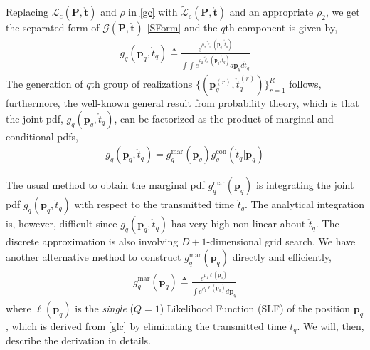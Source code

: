 \documentclass[review]{elsarticle}
\begin{document}
Replacing $\mathcal{L}_c(\boldsymbol{P},\mathring{\boldsymbol{t}})$ and $\rho$ in \eqref{gc} with $\tilde{\mathcal{L}}_c(\boldsymbol{P},\mathring{\boldsymbol{t}})$ and an appropriate $\rho_2$, we get the separated form of $\mathcal{G}(\boldsymbol{P},\mathring{\boldsymbol{t}})$ \eqref{SForm} and the $q$th component is given by,
\begin{align}\label{gq}
    g_q(\boldsymbol{p}_q,\mathring{t}_q)\triangleq\frac{e^{\rho_2 \tilde{\ell}_c(\boldsymbol{p}_q,\mathring{t}_q)}}{\int\int e^{\rho_2 \tilde{\ell}_c(\boldsymbol{p}_q,\mathring{t}_q)}d\boldsymbol{p}_qd\mathring{t}_q }
\end{align}
The generation of $q$th group of realizations $\lbrace(\boldsymbol{p}_q^{(r)},\mathring{t}_q^{(r)})\rbrace_{r=1}^{R}$ follows, furthermore, the well-known general result from probability theory, which is that the joint pdf, $g_q(\boldsymbol{p}_q,\mathring{t}_q)$, can be factorized as the product of marginal and conditional pdfs,
\begin{align}
    g_q(\boldsymbol{p}_q,\mathring{t}_q)=g_{q}^{\text{mar}}(\boldsymbol{p}_q)g_{q}^{\text{con}}(\mathring{t}_q\vert \boldsymbol{p}_q)
\end{align}

The usual method to obtain the marginal pdf $g_{q}^{\text{mar}}(\boldsymbol{p}_q)$ is integrating the joint pdf $g_q(\boldsymbol{p}_q,\mathring{t}_q)$ with respect to the transmitted time $\mathring{t}_q$. The analytical  integration is, however, difficult since $g_q(\boldsymbol{p}_q,\mathring{t}_q)$ has very high non-linear about $\mathring{t}_q$. The discrete approximation is also involving $D+1$-dimensional grid search. We have another alternative method to construct $ g_{q}^{\text{mar}}(\boldsymbol{p}_q)$ directly and efficiently,
\begin{align}\label{gmar}
    g_{q}^{\text{mar}}(\boldsymbol{p}_q)\triangleq\frac{e^{\rho_1\ell(\boldsymbol{p}_q)}}{\int e^{\rho_1\ell(\boldsymbol{p}_q)} d\boldsymbol{p}_q}
\end{align} 
where $\ell(\boldsymbol{p}_q)$ is the \emph{single} ($Q=1$) Likelihood Function (SLF) of the position $\boldsymbol{p}_q$ , which is derived from \eqref{glc} by eliminating the transmitted time $\mathring{t}_q$. We will, then, describe the derivation in details. 
\end{document}
